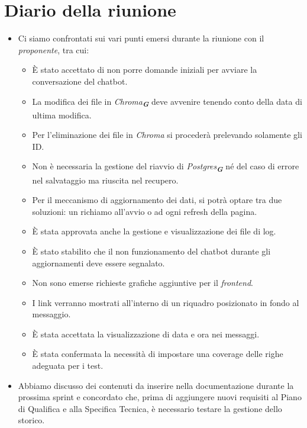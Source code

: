 
\section{Diario della riunione}

\begin{itemize}
    \item Ci siamo confrontati sui vari punti emersi durante la riunione con il \emph{proponente}, tra cui:
    \begin{itemize}
        \item È stato accettato di non porre domande iniziali per avviare la conversazione del chatbot.
        \item La modifica dei file in \emph{Chroma}\textsubscript{\textit{\textbf{G}}} deve avvenire tenendo conto della data di ultima modifica.
        \item Per l’eliminazione dei file in \emph{Chroma} si procederà prelevando solamente gli ID. 
        \item Non è necessaria la gestione del riavvio di \emph{Postgres}\textsubscript{\textit{\textbf{G}}} né del caso di errore nel salvataggio ma riuscita nel recupero.
        \item Per il meccanismo di aggiornamento dei dati, si potrà optare tra due soluzioni: un richiamo all’avvio o ad ogni refresh della pagina.
        \item È stata approvata anche la gestione e visualizzazione dei file di log.
        \item È stato stabilito che il non funzionamento del chatbot durante gli aggiornamenti deve essere segnalato.
        \item Non sono emerse richieste grafiche aggiuntive per il \emph{frontend}.
        \item I link verranno mostrati all’interno di un riquadro posizionato in fondo al messaggio.
        \item È stata accettata la visualizzazione di data e ora nei messaggi. 
        \item È stata confermata la necessità di impostare una coverage delle righe adeguata per i test.
    \end{itemize}
    \item Abbiamo discusso dei contenuti da inserire nella documentazione durante la prossima sprint e concordato che, prima di aggiungere nuovi requisiti al Piano di Qualifica e alla Specifica Tecnica, è necessario testare la gestione dello storico.

\end{itemize}
